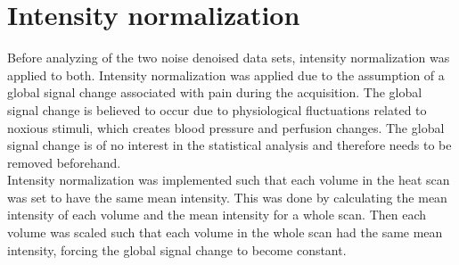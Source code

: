 \section{Intensity normalization}

Before analyzing of the two noise denoised data sets, intensity normalization was applied to both. Intensity normalization was applied due to the assumption of a global signal change associated with pain during the acquisition. The global signal change is believed to occur due to physiological fluctuations related to noxious stimuli, which creates blood pressure and perfusion changes. The global signal change is of no interest in the statistical analysis and therefore needs to be removed beforehand. \cite{Macey2004} \\
Intensity normalization was implemented such that each volume in the heat scan was set to have the same mean intensity. This was done by calculating the mean intensity of each volume and the mean intensity for a whole scan. Then each volume was scaled such that each volume in the whole scan had the same mean intensity, forcing the global signal change to become constant.  